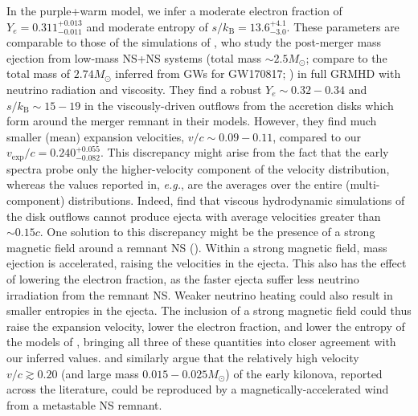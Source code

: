 \documentclass[twocolumn, twocolappendix]{aastex63}
\def\eg{{\it e.g.}}
\begin{document}
In the purple+warm model, we infer a moderate electron fraction of $Y_e = 0.311^{+0.013}_{-0.011}$ and moderate entropy of $s/k_{\mathrm{B}} = 13.6^{+4.1}_{-3.0}$. These parameters are comparable to those of the simulations of \cite{fujibayashi20}, who study the post-merger mass ejection from low-mass NS+NS systems (total mass $\sim 2.5 M_{\odot}$; compare to the total mass of $2.74 M_{\odot}$ inferred from GWs for GW170817; \citealt{abbott17c}) in full GRMHD with neutrino radiation and viscosity. They find a robust $Y_e \sim 0.32 - 0.34$ and $s/k_{\mathrm{B}} \sim 15-19$ in the viscously-driven outflows from the accretion disks which form around the merger remnant in their models. However, they find much smaller (mean) expansion velocities, $v/c \sim 0.09-0.11$, compared to our $v_{\mathrm{exp}}/c = 0.240^{+0.055}_{-0.082}$. This discrepancy might arise from the fact that the early spectra probe only the higher-velocity component of the velocity distribution, whereas the values reported in, \eg, \cite{fujibayashi20} are the averages over the entire (multi-component) distributions. Indeed, \cite{fahlman18} find that viscous hydrodynamic simulations of the disk outflows cannot produce ejecta with average velocities greater than $\sim 0.15c$. One solution to this discrepancy might be the presence of a strong magnetic field around a remnant NS (\citealt{metzger18, fujibayashi20}). Within a strong magnetic field, mass ejection is accelerated, raising the velocities in the ejecta. This also has the effect of lowering the electron fraction, as the faster ejecta suffer less neutrino irradiation from the remnant NS. Weaker neutrino heating could also result in smaller entropies in the ejecta. The inclusion of a strong magnetic field could thus raise the expansion velocity, lower the electron fraction, and lower the entropy of the models of \cite{fujibayashi20}, bringing all three of these quantities into closer agreement with our inferred values. \cite{ciolfi20a} and \cite{ciolfi20b} similarly argue that the relatively high velocity $v/c \gtrsim 0.20$ (and large mass $0.015 - 0.025 M_{\odot}$) of the early kilonova, reported across the literature, could be reproduced by a magnetically-accelerated wind from a metastable NS remnant. 
\end{document}

